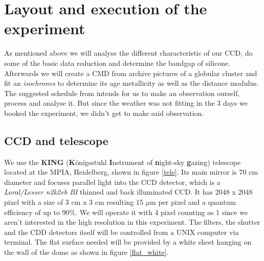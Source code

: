 \section{Layout and execution of the experiment}
As mentioned above we will analyse the different characteristic of our CCD, do some of the basic data reduction and determine the bandgap of silicone. Afterwards we will create a CMD from archive pictures of a globular cluster and fit an \textit{isochrones} to determine its age metallicity as well as the distance modulus. The suggested schedule from \cite{manual} intends for us to make an observation ourself, process and analyse it. But since the weather was not fitting in the 3 days we booked the experiment, we didn't get to make said observation.
\vspace{3mm}\\
\subsection{CCD and telescope}
We use the \textbf{KING} (\textbf{K}önigsstuhl \textbf{I}nstrument of \textbf{n}ight-sky \textbf{g}azing) telescope located at the MPIA, Heidelberg, shown in figure \ref{tele}. Its main mirror is 70 cm diameter and focuses parallel light into the CCD detector, which is a \textit{Loral/Lesser n2k2eb BI} thinned and back illuminated CCD. It has 2048 x 2048 pixel with a size of 3 cm x 3 cm resulting 15 $\mu$m per pixel and a quantum efficiency of up to 90\%. We will operate it with 4 pixel counting as 1 since we aren't interested in the high resolution in this experiment. The filters, the shutter and the CDD detectors itself will be controlled from a UNIX computer via terminal. The flat surface needed will be provided by a white sheet hanging on the wall of the dome as shown in figure \ref{flat_white}. \\
